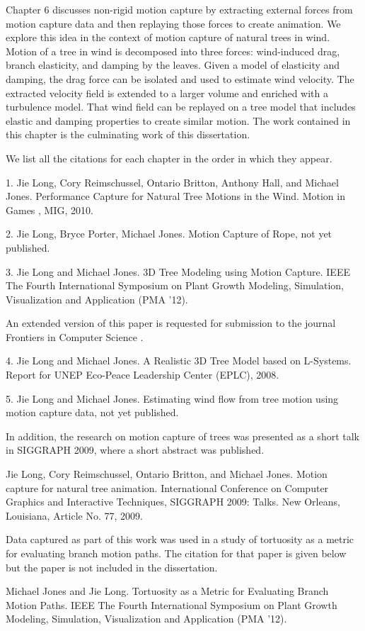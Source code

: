 Chapter 6 discusses non-rigid motion capture by extracting external forces from motion capture data and then replaying those forces to create animation. We explore this idea in the context of motion capture of natural trees in wind. Motion of a tree in wind is decomposed into three forces: wind-induced drag, branch elasticity, and damping by the leaves. Given a model of elasticity and damping, the drag force can be isolated and used to estimate wind velocity. The extracted velocity field is extended to a larger volume and enriched with a turbulence model. That wind field can be replayed on a tree model that includes elastic and damping properties to create similar motion.  The work contained in this chapter is the culminating work of this dissertation.

We list all the citations for each chapter in the order in which they appear.

1. Jie Long, Cory Reimschussel, Ontario Britton, Anthony Hall, and Michael Jones. Performance Capture for Natural Tree Motions in the Wind. Motion in Games , MIG, 2010. 

2. Jie Long, Bryce Porter, Michael Jones. Motion Capture of Rope, not yet published.

3. Jie Long and Michael Jones. 3D Tree Modeling using Motion Capture. IEEE The Fourth International Symposium on Plant Growth Modeling, Simulation, Visualization and Application (PMA '12).

An extended version of this paper is requested for submission to the journal Frontiers in Computer Science . 

4. Jie Long and Michael Jones. A Realistic 3D Tree Model based on L-Systems. Report for UNEP Eco-Peace Leadership Center (EPLC), 2008.

5. Jie Long and Michael Jones. Estimating wind flow from tree motion using motion capture data, not yet published.

In addition, the research on motion capture of trees was presented as a short talk in SIGGRAPH 2009, where a short abstract was published.

Jie Long, Cory Reimschussel, Ontario Britton, and Michael Jones. Motion capture for natural tree animation. International Conference on Computer Graphics and Interactive Techniques, SIGGRAPH 2009: Talks. New Orleans, Louisiana, Article No. 77, 2009. 

Data captured as part of this work was used in a study of tortuosity as a metric for evaluating branch motion paths. The citation for that paper is given below but the paper is not included in the dissertation.  

Michael Jones and Jie Long. Tortuosity as a Metric for Evaluating Branch Motion Paths. IEEE The Fourth International Symposium on Plant Growth Modeling, Simulation, Visualization and Application (PMA '12).